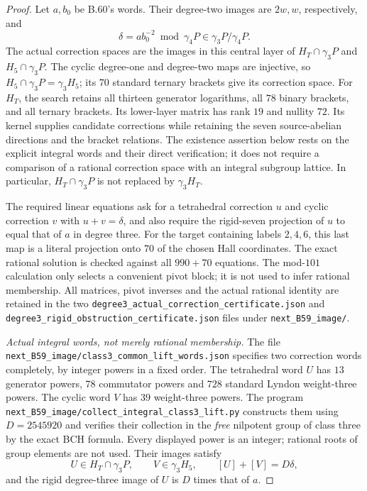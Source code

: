 \begin{proof}
Let $a,b_0$ be B.60's words.  Their degree-two images are
$2w,w$, respectively, and
\[
                 \delta=ab_0^{-2}\bmod\gamma_4P
                  \in\gamma_3P/\gamma_4P.                  \tag{B.61.6}
\]
The actual correction spaces are the images in this
central layer of $H_T\cap\gamma_3P$ and
$H_5\cap\gamma_3P$.
The cyclic degree-one and degree-two maps are injective,
so $H_5\cap\gamma_3P=\gamma_3H_5$; its $70$ standard
ternary brackets give its correction space.
For $H_T$, the search retains all thirteen generator
logarithms, all $78$ binary brackets, and all ternary
brackets.  Its lower-layer matrix has rank $19$ and
nullity $72$.  Its kernel supplies candidate corrections
while retaining the seven source-abelian directions and
the bracket relations.  The existence assertion below
rests on the explicit integral words and their direct
verification; it does not require a comparison of a
rational correction space with an integral subgroup lattice.
In particular, $H_T\cap\gamma_3P$ is not replaced by
$\gamma_3H_T$.

The required linear equations ask for a tetrahedral
correction $u$ and cyclic correction $v$ with
$u+v=\delta$, and also require the rigid-seven projection
of $u$ to equal that of $a$ in degree three.
For the target containing labels $2,4,6$, this last map
is a literal projection onto $70$ of the chosen Hall
coordinates.  The exact rational solution is checked
against all $990+70$ equations.
The mod-$101$ calculation only selects a convenient
pivot block; it is not used to infer rational membership.
All matrices, pivot inverses and the actual rational
identity are retained in the two
\nolinkurl{degree3_actual_correction_certificate.json} and
\nolinkurl{degree3_rigid_obstruction_certificate.json}
files under \nolinkurl{next_B59_image/}.

\emph{Actual integral words, not merely rational membership.}
The file
\nolinkurl{next_B59_image/class3_common_lift_words.json}
specifies two correction words completely, by integer
powers in a fixed order.
The tetrahedral word $U$ has $13$ generator powers,
$78$ commutator powers and $728$ standard Lyndon
weight-three powers.  The cyclic word $V$ has $39$
weight-three powers.
The program
\nolinkurl{next_B59_image/collect_integral_class3_lift.py}
constructs them using $D=2545920$ and verifies their
collection in the \emph{free} nilpotent group of class
three by the exact BCH formula.  Every displayed power
is an integer; rational roots of group elements are
not used.
Their images satisfy
\[
 U\in H_T\cap\gamma_3P,\qquad V\in\gamma_3H_5,
 \qquad [U]+[V]=D\delta,                                  \tag{B.61.7}
\]
and the rigid degree-three image of $U$ is $D$ times
that of $a$.


\end{proof}
